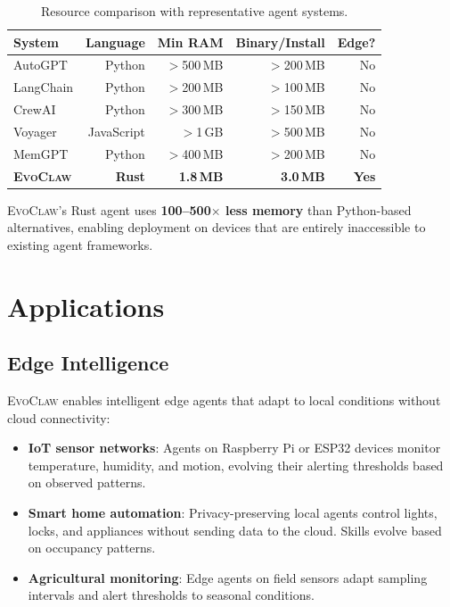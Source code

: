 \documentclass{article}
\newcommand{\evoclaw}{\textsc{EvoClaw}}
\begin{document}
\begin{table}[t]
\centering
\caption{Resource comparison with representative agent systems.}
\label{tab:resource_comparison}
\small
\begin{tabular}{lrrrr}
\toprule
\textbf{System} & \textbf{Language} & \textbf{Min RAM} & \textbf{Binary/Install} & \textbf{Edge?} \\
\midrule
AutoGPT & Python & $>$500\,MB & $>$200\,MB & No \\
LangChain & Python & $>$200\,MB & $>$100\,MB & No \\
CrewAI & Python & $>$300\,MB & $>$150\,MB & No \\
Voyager & JavaScript & $>$1\,GB & $>$500\,MB & No \\
MemGPT & Python & $>$400\,MB & $>$200\,MB & No \\
\midrule
\textbf{\evoclaw{}} & \textbf{Rust} & \textbf{1.8\,MB} & \textbf{3.0\,MB} & \textbf{Yes} \\
\bottomrule
\end{tabular}
\end{table}

\evoclaw{}'s Rust agent uses \textbf{100--500$\times$ less memory} than Python-based alternatives, enabling deployment on devices that are entirely inaccessible to existing agent frameworks.



\section{Applications}
\label{sec:applications}

\subsection{Edge Intelligence}

\evoclaw{} enables intelligent edge agents that adapt to local conditions without cloud connectivity:

\begin{itemize}[leftmargin=*]
    \item \textbf{IoT sensor networks}: Agents on Raspberry Pi or ESP32 devices monitor temperature, humidity, and motion, evolving their alerting thresholds based on observed patterns.
    \item \textbf{Smart home automation}: Privacy-preserving local agents control lights, locks, and appliances without sending data to the cloud. Skills evolve based on occupancy patterns.
    \item \textbf{Agricultural monitoring}: Edge agents on field sensors adapt sampling intervals and alert thresholds to seasonal conditions.
\end{itemize}
\end{document}
